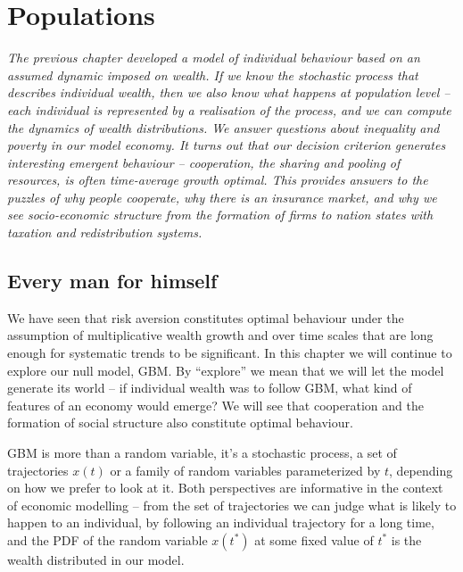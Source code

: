 \newpage


\section{Populations}
{\it 
The previous chapter developed a model of individual behaviour based on an
assumed dynamic imposed on wealth. If we know the stochastic process that describes
individual wealth, then we also know what happens at population level -- each individual
is represented by a realisation of the process, and we can compute 
the dynamics of wealth distributions. We answer questions about inequality and poverty in
our model economy. It turns out that our decision criterion generates interesting emergent
behaviour -- cooperation, the sharing and pooling of resources, is often time-average 
growth optimal. This provides answers to the puzzles of why people cooperate, why there 
is an insurance market, and why we see socio-economic structure from the formation of 
firms to nation states with taxation and redistribution systems.}
\newpage

\subsection{Every man for himself}

We have seen that risk aversion constitutes optimal behaviour under the assumption 
of multiplicative wealth growth and over time scales that are long enough for systematic 
trends to be significant. In this chapter we will continue to explore our null model, 
GBM. By ``explore'' we mean that we will let the model generate its world -- if 
individual wealth was to follow GBM, what kind of features of an economy would emerge? 
We will see that cooperation and the formation of social structure also constitute 
optimal behaviour.

GBM is more than a random variable, it's a stochastic process, \ie a set of trajectories 
$x(t)$ or  a family of random variables parameterized by $t$, depending on how we 
prefer to look at it.  Both perspectives are informative in the context of economic modelling
-- from the set of trajectories we can judge what is likely to happen to an individual, 
\eg by following an individual trajectory for a long time, and the PDF of the random 
variable $x(t^*)$ at some fixed value of $t^*$ is the wealth distributed in our model. 

